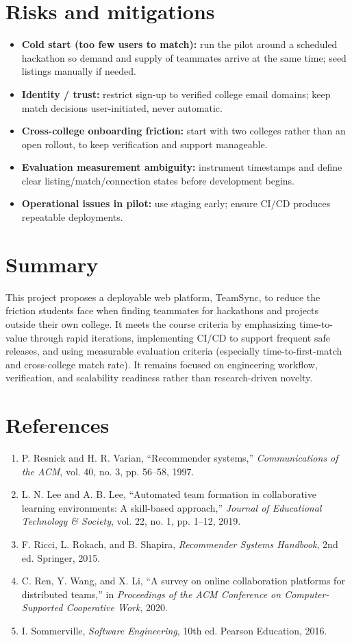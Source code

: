 \documentclass[11pt]{article}
\begin{document}
\section{Risks and mitigations}
\begin{itemize}[leftmargin=*]
  \item \textbf{Cold start (too few users to match):} run the pilot around a scheduled hackathon
  so demand and supply of teammates arrive at the same time; seed listings manually if needed.
  \item \textbf{Identity / trust:} restrict sign-up to verified college email domains; keep
  match decisions user-initiated, never automatic.
  \item \textbf{Cross-college onboarding friction:} start with two colleges rather than an open
  rollout, to keep verification and support manageable.
  \item \textbf{Evaluation measurement ambiguity:} instrument timestamps and define clear
  listing/match/connection states before development begins.
  \item \textbf{Operational issues in pilot:} use staging early; ensure CI/CD produces
  repeatable deployments.
\end{itemize}

\section{Summary}
This project proposes a deployable web platform, TeamSync, to reduce the friction students
face when finding teammates for hackathons and projects outside their own college. It meets the
course criteria by emphasizing time-to-value through rapid iterations, implementing CI/CD to
support frequent safe releases, and using measurable evaluation criteria (especially
time-to-first-match and cross-college match rate). It remains focused on engineering workflow,
verification, and scalability readiness rather than research-driven novelty.

\section{References}
\begin{enumerate}[leftmargin=*]
  \item P. Resnick and H. R. Varian, ``Recommender systems,'' \textit{Communications of the
  ACM}, vol. 40, no. 3, pp. 56--58, 1997.
  \item L. N. Lee and A. B. Lee, ``Automated team formation in collaborative learning
  environments: A skill-based approach,'' \textit{Journal of Educational Technology \& Society},
  vol. 22, no. 1, pp. 1--12, 2019.
  \item F. Ricci, L. Rokach, and B. Shapira, \textit{Recommender Systems Handbook}, 2nd ed.
  Springer, 2015.
  \item C. Ren, Y. Wang, and X. Li, ``A survey on online collaboration platforms for
  distributed teams,'' in \textit{Proceedings of the ACM Conference on Computer-Supported
  Cooperative Work}, 2020.
  \item I. Sommerville, \textit{Software Engineering}, 10th ed. Pearson Education, 2016.
\end{enumerate}
\end{document}
